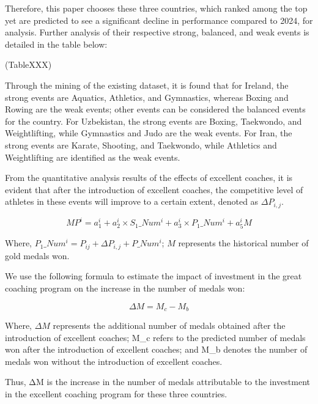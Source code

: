 \documentclass{mcmthesis}
\begin{document}
Therefore, this paper chooses these three countries, which ranked among the top yet are predicted to see a significant decline in performance compared to 2024, for analysis. Further analysis of their respective strong, balanced, and weak events is detailed in the table below:

(TableXXX)

Through the mining of the existing dataset, it is found that for Ireland, the strong events are Aquatics, Athletics, and Gymnastics, whereas Boxing and Rowing are the weak events; other events can be considered the balanced events for the country. For Uzbekistan, the strong events are Boxing, Taekwondo, and Weightlifting, while Gymnastics and Judo are the weak events. For Iran, the strong events are Karate, Shooting, and Taekwondo, while Athletics and Weightlifting are identified as the weak events.

From the quantitative analysis results of the effects of excellent coaches, it is evident that after the introduction of excellent coaches, the competitive level of athletes in these events will improve to a certain extent, denoted as $\Delta P_{i, j}$.

\begin{equation}
MP^{i} = a_{1} ^ {i} + a_{2} ^{i}\times S_{1}\_Num^{i} + a_{3}^{i}\times P_{1}\_Num^{i} + a_{5}^{i}M
\end{equation}

Where, $P_{1}\_Num^{i}=P_{ij} + \Delta P_{i, j} + P\_Num^{i}$; $M$ represents the historical number of gold medals won.

We use the following formula to estimate the impact of investment in the great coaching program on the increase in the number of medals won:

\begin{equation}
\Delta M=M_{c} - M_{b}
\end{equation}

Where, $\Delta M$ represents the additional number of medals obtained after the introduction of excellent coaches; M_{c} refers to the predicted number of medals won after the introduction of excellent coaches; and M_{b} denotes the number of medals won without the introduction of excellent coaches.

Thus, ΔM is the increase in the number of medals attributable to the investment in the excellent coaching program for these three countries.
\end{document}
